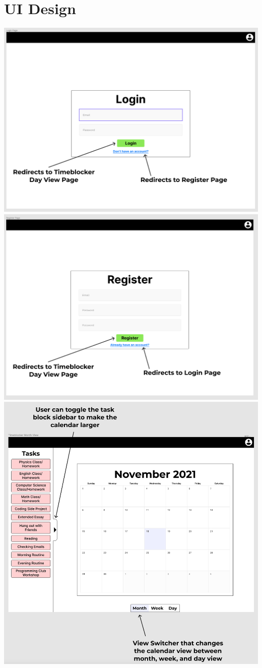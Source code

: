 \documentclass[12pt]{report}
\begin{document}
\section*{UI Design}
\includegraphics[width=\textwidth]{login-page.png}
\includegraphics[width=\textwidth]{register-page.png}
\includegraphics[width=\textwidth]{month-view.png}
\end{document}

